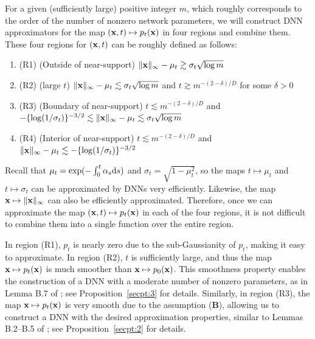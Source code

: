 \documentclass[twoside,11pt]{article}
\newcommand{\bB}{{\bf B}}
\newcommand{\bx}{{\bf x}}
\def\d{{\rm d}}
\begin{document}
For a given (sufficiently large) positive integer $m$, which roughly corresponds to the order of the number of nonzero network parameters, we will construct DNN approximators for the map $(\bx, t) \mapsto p_t(\bx)$ in four regions and combine them. These four regions for $(\bx, t)$ can be roughly defined as follows:
\begin{enumerate}[label = {} ]
 \item[](R1) (Outside of near-support) $\|\bx\|_\infty - \mu_t \gtrsim \sigma_t \sqrt{\log m}$
 \item[](R2) (large $t$) $\|\bx\|_\infty - \mu_t \lesssim \sigma_t \sqrt{\log m}$ and $t \gtrsim m^{-(2-\delta)/D}$ for some $\delta > 0$
 \item[](R3) (Boundary of near-support) $t \lesssim m^{-(2-\delta)/D}$ and $ -\{ \log (1/\sigma_{t})\}^{-3/2} \lesssim \|\bx\|_\infty - \mu_t \lesssim \sigma_t \sqrt{\log m}$
 \item[](R4) (Interior of near-support) $t \lesssim m^{-(2-\delta)/D}$ and $\|\bx\|_\infty - \mu_t \lesssim -\{ \log (1/\sigma_{t})\}^{-3/2}$
\end{enumerate}
Recall that $\mu_t = \exp ( - \int_{0}^{t} \alpha_s \d s )$ and $ \sigma_{t} = \sqrt{1 - \mu_{t}^2}$, so the maps $t \mapsto \mu_t$ and $t \mapsto \sigma_t$ can be approximated by DNNs very efficiently.
Likewise, the map $\bx \mapsto \|\bx\|_\infty$ can also be efficiently approximated.
Therefore, once we can approximate the map $(\bx, t) \mapsto p_t(\bx)$ in each of the four regions, it is not difficult to combine them into a single function over the entire region.

In region (R1), $p_t$ is nearly zero due to the sub-Gaussianity of $p_t$, making it easy to approximate. In region (R2), $t$ is sufficiently large, and thus the map $\bx \mapsto p_t(\bx)$ is much smoother than $\bx \mapsto p_0(\bx)$. This smoothness property enables the construction of a DNN with a moderate number of nonzero parameters, as in Lemma B.7 of \citet{oko2023diffusion}; see Proposition~\ref{secpt:3}  for details. Similarly, in region (R3), the map $\bx \mapsto p_t(\bx)$ is very smooth due to the assumption (\bB), allowing us to construct a DNN with the desired approximation properties, similar to Lemmas B.2--B.5 of \citet{oko2023diffusion}; see Proposition~\ref{secpt:2} for details.
\end{document}
